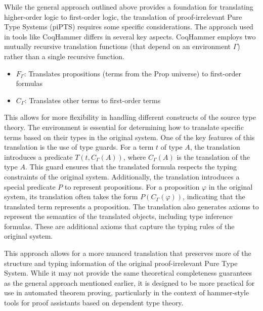 While the general approach outlined above provides a foundation for translating higher-order logic to first-order logic, the translation of proof-irrelevant Pure Type Systems (piPTS) \cite{czajka2018shallow} requires some specific considerations. 
The approach used in tools like CoqHammer \cite{coqhammer} differs in several key aspects.
CoqHammer employs two mutually recursive translation functions (that depend on an environment $\Gamma$) rather than a single recursive function.
\begin{itemize}
\item $F_\Gamma$: Translates propositions (terms from the Prop universe) to first-order formulas
\item $C_\Gamma$: Translates other terms to first-order terms
\end{itemize}
This allows for more flexibility in handling different constructs of the source type theory.
The environment is essential for determining how to translate specific terms based on their types in the original system.
One of the key features of this translation is the use of type guards. 
For a term $t$ of type $A$, the translation introduces a predicate $T(t, C_\Gamma(A))$, where $C_\Gamma(A)$ is the translation of the type $A$. 
This guard ensures that the translated formula respects the typing constraints of the original system.
Additionally, the translation introduces a special predicate $P$ to represent propositions.
For a proposition $\varphi$ in the original system, its translation often takes the form $P(C_\Gamma(\varphi))$, indicating that the translated term represents a proposition.
The translation also generates axioms to represent the semantics of the translated objects, including type inference formulas. 
These are additional axioms that capture the typing rules of the original system. 

This approach allows for a more nuanced translation that preserves more of the structure and typing information of the original proof-irrelevant Pure Type System. 
While it may not provide the same theoretical completeness guarantees as the general approach mentioned earlier, it is designed to be more practical for use in automated theorem proving, particularly in the context of hammer-style tools for proof assistants based on dependent type theory.
